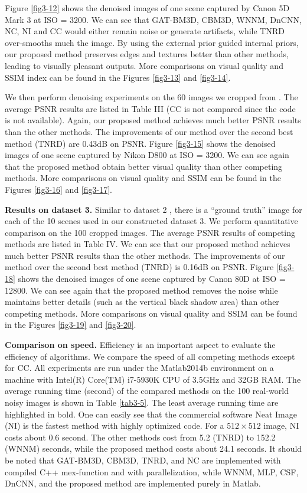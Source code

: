 Figure \ref{fig3-12} shows the denoised images of one scene captured by Canon 5D Mark 3 at ISO = 3200. We can see that GAT-BM3D, CBM3D, WNNM, DnCNN, NC, NI and CC would either remain noise or generate artifacts, while TNRD over-smooths much the image. By using the external prior guided internal priors, our proposed method preserves edges and textures better than other methods, leading to visually pleasant outputs. More comparisons on visual quality and SSIM \cite{ssim} index can be found in the Figures \ref{fig3-13} and \ref{fig3-14}.

We then perform denoising experiments on the 60 images we cropped from \cite{crosschannel2016}. The average PSNR results are listed in Table III (CC is not compared since the code is not available). Again, our proposed method achieves much better PSNR results than the other methods. The improvements of our method over the second best method (TNRD) are 0.43dB on PSNR. Figure \ref{fig3-15} shows the denoised images of one scene captured by Nikon D800 at ISO = 3200. We can see again that the proposed method obtain better visual quality than other competing methods. More comparisons on visual quality and SSIM can be found in the Figures \ref{fig3-16} and \ref{fig3-17}.

\textbf{Results on dataset 3.}
Similar to dataset 2 \cite{crosschannel2016}, there is a ``ground truth'' image for each of the 10 scenes used in our constructed dataset 3. We perform quantitative comparison on the 100 cropped images. The average PSNR results of competing methods are listed in Table IV. We can see that our proposed method achieves much better PSNR results than the other methods. The improvements of our method over the second best method (TNRD) is 0.16dB on PSNR. Figure \ref{fig3-18} shows the denoised images of one scene captured by Canon 80D at ISO = 12800. We can see again that the proposed method removes the noise while maintains better details (such as the vertical black shadow area) than other competing methods. More comparisons on visual quality and SSIM can be found in the Figures \ref{fig3-19} and \ref{fig3-20}.

\textbf{Comparison on speed.}
Efficiency is an important aspect to evaluate the efficiency of algorithms. We compare the speed of all competing methods except for CC. All experiments are run under the Matlab2014b environment on a machine with Intel(R) Core(TM) i7-5930K CPU of 3.5GHz and 32GB RAM. The average running time (second) of the compared methods on the 100 real-world noisy images is shown in Table \ref{tab3-5}. The least average running time are highlighted in bold. One can easily see that the commercial software Neat Image (NI) is the fastest method with highly optimized code. For a $512\times512$ image, NI costs about 0.6 second. The other methods cost from 5.2 (TNRD) to 152.2 (WNNM) seconds, while the proposed method costs about 24.1 seconds. It should be noted that GAT-BM3D, CBM3D, TNRD, and NC are implemented with compiled C++ mex-function and with parallelization, while WNNM, MLP, CSF, DnCNN, and the proposed method are implemented purely in Matlab. 

